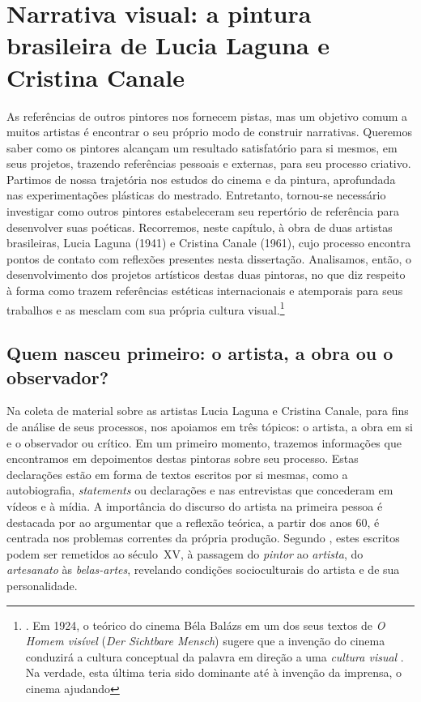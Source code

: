 \chapter{Narrativa visual: a pintura brasileira de Lucia Laguna e Cristina Canale}\label{cap3-narrativa-visual}

As referências de outros pintores nos fornecem pistas, mas um objetivo
comum a muitos artistas é encontrar o seu próprio modo de construir
narrativas. Queremos saber como os pintores alcançam um resultado
satisfatório para si mesmos, em seus projetos, trazendo referências
pessoais e externas, para seu processo criativo. Partimos de nossa
trajetória nos estudos do cinema e da pintura, aprofundada nas
experimentações plásticas do mestrado. Entretanto, tornou-se necessário
investigar como outros pintores estabeleceram seu repertório de
referência para desenvolver suas poéticas. Recorremos, neste capítulo,
à obra de duas artistas brasileiras, Lucia Laguna (1941) e Cristina
Canale (1961), cujo processo encontra pontos de contato com reflexões
presentes nesta dissertação. Analisamos, então, o desenvolvimento dos
projetos artísticos destas duas pintoras, no que diz respeito à forma
como trazem referências estéticas internacionais e atemporais para seus
trabalhos e as mesclam com sua própria cultura
visual.\footnote{. Em 1924, o teórico do
	cinema Béla Balázs em um dos seus textos de \emph{O Homem visível}
	(\emph{Der Sichtbare Mensch}) sugere que a invenção do cinema conduzirá
	a cultura conceptual da palavra em direção a uma \emph{cultura visual}
	. Na verdade, esta última teria sido
	dominante até à invenção da imprensa, o cinema ajudando }

\section{Quem nasceu primeiro: o artista, a obra ou o observador?}%
\label{sec:quem-nasceu-primeiro-o-artista-a-obra-ou-o-observador}

Na coleta de material sobre as artistas Lucia Laguna e Cristina Canale,
para fins de análise de seus processos, nos apoiamos em três tópicos: o
artista, a obra em si e o observador ou crítico. Em um primeiro
momento, trazemos informações que encontramos em depoimentos destas
pintoras sobre seu processo. Estas declarações estão em forma de textos
escritos por si mesmas, como a autobiografia, \emph{statements} ou
declarações e nas entrevistas que concederam em vídeos e à mídia. A
importância do discurso do artista na primeira pessoa é destacada por
\textcite{ferreira2006escritos}
ao argumentar que a reflexão teórica, a
partir dos anos 60, é centrada nos problemas correntes da própria
produção. Segundo \textcite{ferreira2006escritos}, estes escritos podem ser remetidos ao
século~XV, à passagem do \emph{pintor} ao \emph{artista}, do
\emph{artesanato} às \emph{belas-artes}, revelando condições
socioculturais do artista e de sua personalidade.

